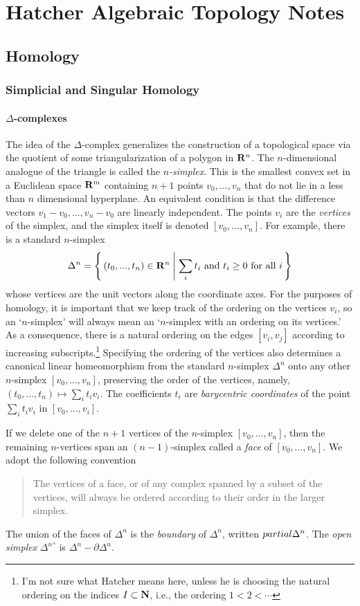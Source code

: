 \chapter{Hatcher Algebraic Topology Notes}
\section{Homology}
\subsection{Simplicial and Singular Homology}
\subsubsection[Delta-complexes]{$\Delta$-complexes}
The idea of the $\Delta$-complex generalizes the construction of a
topological space via the quotient of some triangularization of a polygon
in $\mathbf{R}^n$. The $n$-dimensional analogue of the triangle is called the
\emph{$n$-simplex}. This is the smallest convex set in a Euclidean space
$\mathbf{R}^m$ containing $n+1$ points $v_0,...,v_n$ that do not lie in a less
than $n$ dimensional hyperplane. An equivalent condition is that the
difference vectors $v_1-v_0,...,v_n-v_0$ are linearly independent. The
points $v_i$ are the \emph{vertices} of the simplex, and the simplex itself
is denoted $[v_0,...,v_n]$. For example, there is a standard $n$-simplex
\[
\Delta^n=\left\{\,(t_0,...,t_n)\in\mathbf{R}^n\;\middle|\;\text{$\sum_it_i$
and $t_i\geq 0$ for all $i$}\,\right\}
\]
whose vertices are the unit vectors along the coordinate axes. For the
purposes of homology, it is important that we keep track of the ordering on
the vertices $v_i$, so an `$n$-simplex' will always mean an `$n$-simplex
with an ordering on its vertices.' As a consequence, there is a natural
ordering on the edges $[v_i,v_j]$ according to increasing
subscripts.\footnote{I'm not sure what Hatcher means here, unless he is
  choosing the natural ordering on the indices $I\subset\mathbf{N}$, i.e., the
  ordering $1<2<\cdots$} Specifying the ordering of the vertices also
determines a canonical linear homeomorphism from the standard $n$-simplex
$\Delta^n$ onto any other $n$-simplex $[v_0,...,v_n]$, preserving the order
of the vertices, namely, $(t_0,...,t_n)\mapsto\sum_it_iv_i$. The
coefficients $t_i$ are \emph{barycentric coordinates} of the point
$\sum_it_iv_i$ in $[v_0,...,v_i]$.

If we delete one of the $n+1$ vertices of the $n$-simplex $[v_0,...,v_n]$,
then the remaining $n$-vertices span an $(n-1)$-simplex called a
\emph{face} of $[v_0,...,v_n]$. We adopt the following convention
\begin{quotation}
The vertices of a face, or of any complex spanned by a subset of the
vertices, will always be ordered according to their order in the larger
simplex.
\end{quotation}
The union of the faces of $\Delta^n$ is the \emph{boundary} of $\Delta^n$,
written $\\partial\Delta^n$. The \emph{open simplex}
$\left.\Delta^n\right.^\circ$ is $\Delta^n\minus\partial\Delta^n$.

